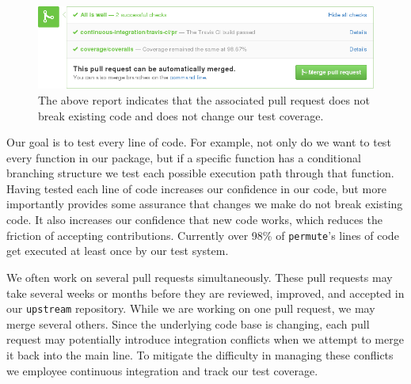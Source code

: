 \documentclass[]{article}
\begin{document}
\begin{figure}
  \begin{centering}
    \includegraphics[width=\textwidth]{_fig/pull-request-ci.png}\par
  \end{centering}

  \caption{\label{fig:pull-request}
  \small
    The above report indicates that the associated pull request does not
    break existing code and does not change our test coverage.}
\end{figure}

Our goal is to test every line of code.
For example, not only do we want to test every function in our package, but if
a specific function has a conditional branching structure we test each
possible execution path through that function.
Having tested each line of code increases our confidence in our code, but
more importantly provides some assurance that changes we make do
not break existing code.
It also increases our confidence that new code works, which reduces the
friction of accepting contributions.
Currently over 98\% of \texttt{permute}'s lines of code get executed at least
once by our test system.

We often work on several pull requests simultaneously.
These pull requests may take several weeks or months before they are reviewed,
improved, and accepted in our \texttt{upstream} repository.
While we are working on one pull request, we may merge several others.
Since the underlying code base is changing, each pull request may potentially
introduce integration conflicts when we attempt to merge it back into
the main line.
To mitigate the difficulty in managing these conflicts we employee
continuous integration and track our test coverage.
\end{document}
